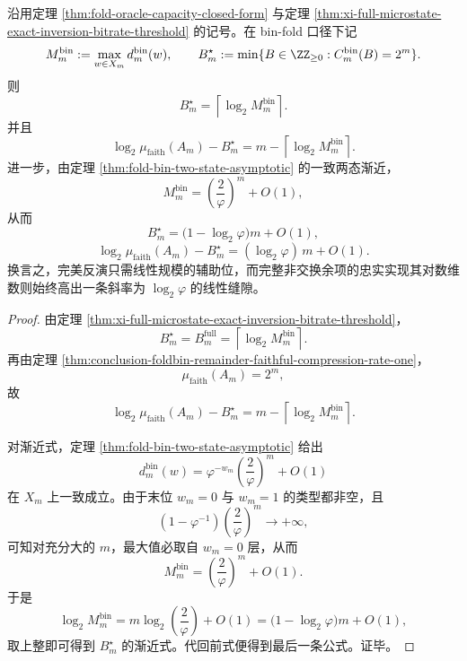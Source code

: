 \begin{theorem}[完美反演与忠实实现的指数分离]\label{thm:conclusion-foldbin-faithful-vs-fullinversion-exponential-separation}
沿用定理 \ref{thm:fold-oracle-capacity-closed-form} 与定理 \ref{thm:xi-full-microstate-exact-inversion-bitrate-threshold} 的记号。在 bin-fold 口径下记
\[
M_m^{\mathrm{bin}}:=\max_{w\in X_m}d_m^{\mathrm{bin}}(w),
\qquad
B_m^\star:=\min\{B\in\ZZ_{\ge 0}:C_m^{\mathrm{bin}}(B)=2^m\}.
\]
则
\[
\boxed{\;
B_m^\star=\left\lceil \log_2 M_m^{\mathrm{bin}}\right\rceil.\;}
\]
并且
\[
\boxed{\;
\log_2\mu_{\mathrm{faith}}(A_m)-B_m^\star
=
m-\left\lceil \log_2 M_m^{\mathrm{bin}}\right\rceil.\;}
\]
进一步，由定理 \ref{thm:fold-bin-two-state-asymptotic} 的一致两态渐近，
\[
M_m^{\mathrm{bin}}
=
\left(\frac{2}{\varphi}\right)^m+O(1),
\]
从而
\[
\boxed{\;
B_m^\star
=
\bigl(1-\log_2\varphi\bigr)m+O(1),\;}
\]
\[
\boxed{\;
\log_2\mu_{\mathrm{faith}}(A_m)-B_m^\star
=
(\log_2\varphi)\,m+O(1).\;}
\]
换言之，完美反演只需线性规模的辅助位，而完整非交换余项的忠实实现其对数维数则始终高出一条斜率为 \(\log_2\varphi\) 的线性缝隙。
\end{theorem}
\begin{proof}
由定理 \ref{thm:xi-full-microstate-exact-inversion-bitrate-threshold}，
\[
B_m^\star=B_m^{\mathrm{full}}=\left\lceil \log_2 M_m^{\mathrm{bin}}\right\rceil.
\]
再由定理 \ref{thm:conclusion-foldbin-remainder-faithful-compression-rate-one}，
\[
\mu_{\mathrm{faith}}(A_m)=2^m,
\]
故
\[
\log_2\mu_{\mathrm{faith}}(A_m)-B_m^\star
=
m-\left\lceil \log_2 M_m^{\mathrm{bin}}\right\rceil.
\]

对渐近式，定理 \ref{thm:fold-bin-two-state-asymptotic} 给出
\[
d_m^{\mathrm{bin}}(w)
=
\varphi^{-w_m}\left(\frac{2}{\varphi}\right)^m+O(1)
\]
在 \(X_m\) 上一致成立。由于末位 \(w_m=0\) 与 \(w_m=1\) 的类型都非空，且
\[
\left(1-\varphi^{-1}\right)\left(\frac{2}{\varphi}\right)^m\to+\infty,
\]
可知对充分大的 \(m\)，最大值必取自 \(w_m=0\) 层，从而
\[
M_m^{\mathrm{bin}}
=
\left(\frac{2}{\varphi}\right)^m+O(1).
\]
于是
\[
\log_2 M_m^{\mathrm{bin}}
=
m\log_2\!\left(\frac{2}{\varphi}\right)+O(1)
=
\bigl(1-\log_2\varphi\bigr)m+O(1),
\]
取上整即可得到 \(B_m^\star\) 的渐近式。代回前式便得到最后一条公式。证毕。
\end{proof}

